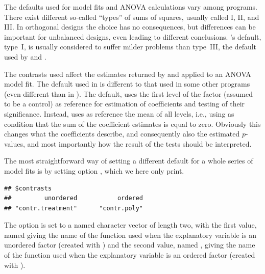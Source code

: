 \documentclass[krantz2]{krantz}\usepackage{knitr}
\begin{document}
\begin{warningbox}
The defaults used for model fits and ANOVA calculations vary among programs. There exist different so-called ``types'' of sums of squares, usually called I, II, and III. In orthogonal designs the choice has no consequences, but differences can be important for unbalanced designs, even leading to different conclusions. \Rlang's default, type~I, is usually considered to suffer milder problems than type~III, the default used by  and .
\end{warningbox}

\begin{warningbox}
The contrasts used affect the estimates returned by  and  applied to an ANOVA model fit. The default used in \Rlang is different to that used in some other programs (even different than in \Slang). The default,  uses the first level of the factor (assumed to be a control) as reference for estimation of coefficients and testing of their significance. Instead,  uses as reference the mean of all levels, i.e., using as condition that the sum of the coefficient estimates is equal to zero. Obviously this changes what the coefficients describe, and consequently also the estimated $p$-values, and most importantly how the result of the tests should be interpreted.
\end{warningbox}

The most straightforward way of setting a different default for a whole series of model fits is by setting \Rlang option , which we here only print.

\begin{knitrout}\footnotesize
{}\color{fgcolor}\begin{kframe}
\begin{alltt}
\hlstd{(}\hlstd{)}
\end{alltt}
\begin{verbatim}
## $contrasts
##         unordered           ordered 
## "contr.treatment"      "contr.poly"
\end{verbatim}
\end{kframe}
\end{knitrout}

The option is set to a named character vector of length two, with the first value, named  giving the name of the function used when the explanatory variable is an unordered factor (created with ) and the second value, named , giving the name of the function used when the explanatory variable is an ordered factor (created with ).
\end{document}
